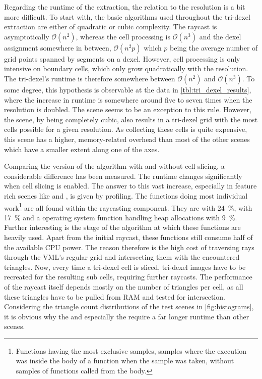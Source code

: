 Regarding the runtime of the extraction, the relation to the resolution is a bit more difficult.
To start with, the basic algorithms used throughout the tri-dexel extraction are either of quadratic or cubic complexity.
The raycast is asymptotically $\mathcal{O}(n^2)$, whereas the cell processing is $\mathcal{O}(n^3)$ and the dexel assignment somewhere in between, $\mathcal{O}(n^2p)$ which $p$ being the average number of grid points spanned by segments on a dexel.
However, cell processing is only intensive on boundary cells, which only grow quadratically with the resolution.
The tri-dexel's runtime is therefore somewhere between $\mathcal{O}(n^2)$ and $\mathcal{O}(n^3)$.
To some degree, this hypothesis is observable at the data in \cref{tbl:tri_dexel_results}, where the increase in runtime is somewhere around five to seven times when the resolution is doubled.
The \cubes scene seems to be an exception to this rule.
However, the \cubes scene, by being completely cubic, also results in a tri-dexel grid with the most cells possible for a given resolution.
As collecting these cells is quite expensive, this scene has a higher, memory-related overhead than most of the other scenes which have a smaller extent along one of the axes.

Comparing the version of the algorithm with and without cell slicing, a considerable difference has been measured.
The runtime changes significantly when cell slicing is enabled.
The answer to this vast increase, especially in feature rich scenes like \impeller and \turbine, is given by profiling.
The functions doing most individual work\footnote{
	Functions having the most exclusive samples, \ie samples where the execution was inside the body of a function when the sample was taken, without samples of functions called from the body.}
are all found within the raycasting component.
They are  with \SI{24}{\percent},  with \SI{17}{\percent} and a operating system function handling heap allocations with \SI{9}{\percent}.
Further interesting is the stage of the algorithm at which these functions are heavily used.
Apart from the initial raycast, these functions still consume half of the available CPU power.
The reason therefore is the high cost of traversing rays through the VML's regular grid and intersecting them with the encountered triangles.
Now, every time a tri-dexel cell is sliced, tri-dexel images have to be recreated for the resulting sub cells, requiring further raycasts.
The performance of the raycast itself depends mostly on the number of triangles per cell, as all these triangles have to be pulled from RAM and tested for intersection.
Considering the triangle count distributions of the test scenes in \cref{fig:histograms}, it is obvious why the \impeller and especially the \turbine require a far longer runtime than other scenes. %


